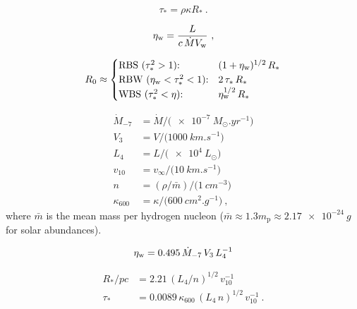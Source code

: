 \documentclass[useAMS, usenatbib, a4paper]{mnras}
\begin{document}
\begin{equation}
  \label{eq:tau-star}
  \tau_* = \rho \kappa R_* \ .
\end{equation}


\begin{equation}
  \label{eq:wind-efficiency}
  \eta_{\text{w}}  = \frac{L}{c\, \dot{M} V_{\text{w}}} \ , 
\end{equation}

\begin{equation}
  \label{eq:x-cases}
  R_0 \approx
  \begin{cases}
    \text{RBS (\(\tau_*^2 > 1\)):} & (1 + \eta_{\text{w}})^{1/2} \, R_*  \\
    \text{RBW (\(\eta\ensuremath{_{\text{w}}}< \tau_*^2 < 1\)):} & 2 \, \tau_* \, R_* \\
    \text{WBS (\(\tau_*^2 < \eta\)):} & \eta_{\text{w}}^{1/2} \, R_*  
  \end{cases}
\end{equation}


\begin{align*}
  \label{eq:stellar-parameters}
  \dot{M}_{-7} &= \dot{M} / \bigl(\SI{e-7}{M_\odot.yr^{-1}}\bigr) \\
  V_3 &= V / \bigl(\SI{1000}{km.s^{-1}}\bigr) \\
  L_4 &= L / \bigl(\SI{e4}{L_\odot}\bigr) \\
  v_{10} &= v_\infty / \bigl( \SI{10}{km.s^{-1}} \bigr) \\
  n &= (\rho / \bar{m}) / \bigl( \SI{1}{cm^{-3}} \bigr) \\
  \kappa_{600} &= \kappa / \bigl( \SI{600}{cm^2.g^{-1}} \bigr) \ ,
\end{align*}
where \(\bar{m}\) is the mean mass per hydrogen nucleon
(\(\bar{m} \approx 1.3 m_{\text{p}} \approx \SI{2.17e-24}{g}\) for solar
abundances).

\begin{equation}
  \label{eq:wind-eta-typical}
  \eta_{\text{w}} = \num{0.495} \,\dot{M}_{-7} \,V_3  \,L_4^{-1}
\end{equation}

\begin{align}
  \label{eq:Rstar-typical}
  R_* / \si{pc} &= \num{2.21} \, (L_4 / n)^{1/2} \,v_{10}^{-1} \\
  \label{eq:taustar-typical}
  \tau_* &= \num{0.0089} \,\kappa_{600} \, (L_4 \,n)^{1/2} \,v_{10}^{-1} \ .
\end{align}
\end{document}
